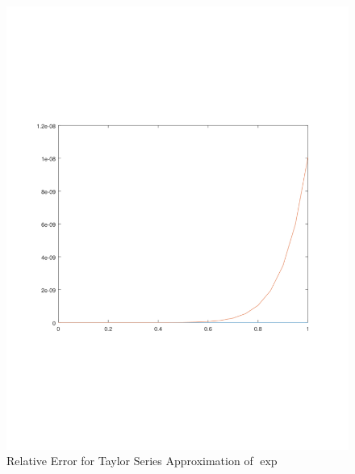 \documentclass[11pt,a4paper,dvipsnames]{article}
\theoremstyle{definition}
\theoremstyle{definition}
\begin{document}
\begin{figure}[ht]
  \centering
    \includegraphics[width=\textwidth]{taylor_exp}
  \caption{Relative Error for Taylor Series Approximation of  $\exp$}
  \label{fig:exp-approx-taylor}
\end{figure}
\end{document}
